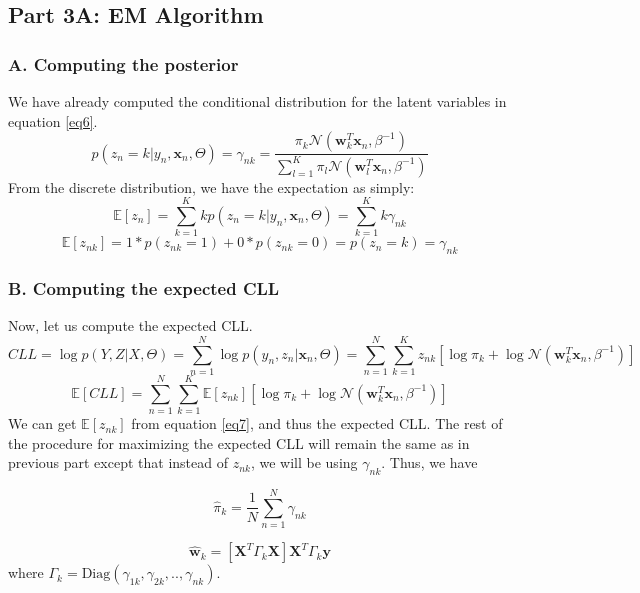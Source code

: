 \documentclass[a4paper,11pt]{article}
\begin{document}
\begin{mlsolution}
\subsection{Part 3A: EM Algorithm}

\subsubsection{A. Computing the posterior}

We have already computed the conditional distribution for the latent variables in equation \ref{eq6}. 
\[
\boxed{p(z_n = k| y_n, \textbf{x}_n, \Theta) = \gamma_{nk} = \frac{\pi_k \mathcal{N}(\textbf{w}^{T}_{k}\textbf{x}_n , \beta^{-1})}{\sum_{l=1}^{K}\pi_l \mathcal{N}(\textbf{w}^{T}_{l}\textbf{x}_n , \beta^{-1})}}
\]
From the discrete distribution, we have the expectation as simply:
\[
\mathbb{E}[z_n] = \sum_{k=1}^{K}kp(z_n = k| y_n, \textbf{x}_n, \Theta) = \sum_{k=1}^{K}k\gamma_{nk}
\]
\begin{equation}
\label{eq7}
\mathbb{E}[z_{nk}] = 1*p(z_{nk} = 1) + 0*p(z_{nk}=0) = p(z_{n} = k) = \gamma_{nk} 
\end{equation}

\subsubsection{B. Computing the expected CLL}
Now, let us compute the expected CLL.
\[
CLL = \log p(Y, Z| X, \Theta) = \sum_{n=1}^{N}\log p(y_n, z_n|\textbf{x}_n, \Theta) =  \sum_{n=1}^{N}\sum_{k=1}^{K}z_{nk}\left[ \log\pi_{k} + \log \mathcal{N}(\textbf{w}^{T}_{k}\textbf{x}_n, \beta^{-1}) \right]
\]
\begin{equation}
\mathbb{E}[CLL] = \sum_{n=1}^{N}\sum_{k=1}^{K}\mathbb{E}[z_{nk}]\left[ \log\pi_{k} + \log \mathcal{N}(\textbf{w}^{T}_{k}\textbf{x}_n, \beta^{-1}) \right]
\label{eq8}
\end{equation}
We can get $\mathbb{E}[z_{nk}]$ from equation \ref{eq7}, and thus the expected CLL. The rest of the procedure for maximizing the expected CLL will remain the same as in previous part except that instead of $z_{nk}$, we will be using $\gamma_{nk}$. Thus, we have

\begin{equation}
\boxed{\hat{\pi}_k = \frac{1}{N}\sum_{n=1}^{N}\gamma_{nk}}
\label{eq9}
\end{equation}

\begin{equation}
\boxed{\hat{\textbf{w}}_k = [\textbf{X}^{T}\Gamma_{k}\textbf{X}]\textbf{X}^{T}\Gamma_{k}\textbf{y}}
\label{eq10}
\end{equation}
where $\Gamma_{k} = \text{Diag}(\gamma_{1k}, \gamma_{2k},.., \gamma_{nk})$.


\end{mlsolution}
\end{document}
